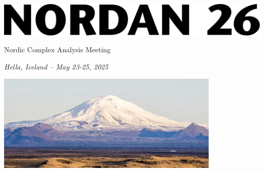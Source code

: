 \documentclass[12pt, openany]{report}      %
\def\SUBTITLE{Nordic Complex Analysis Meeting}
\def\LOCATION{Hella, Iceland -- May 23-25, 2025}
\begin{document}
\begin{titlepage}
    \centering
    \includegraphics[scale = 0.45]{figs/title} \\
    \vspace{0.5cm}
    {\Huge \textrm{\SUBTITLE}\par}
    \vspace{0.5cm}
    {\Large \textsl{\LOCATION}\par}
    \vspace{2cm}
    \vfill
    \vfill
    \vfill
    \includegraphics[width=0.8\textwidth]{figs/cover_crop}\par\vspace{1cm}
    \vfill
    \vfill
\end{titlepage}

\newpage
\thispagestyle{empty}
\end{document}
